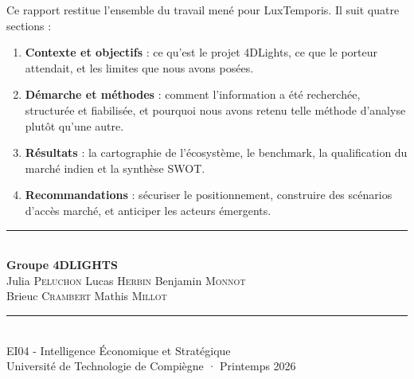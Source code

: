 \documentclass[11pt,a4paper]{article}
\begin{document}
\begin{center}
\begin{minipage}{0.85\linewidth}
{\small Ce rapport restitue l'ensemble du travail mené pour LuxTemporis. Il suit quatre sections :}
\begin{enumerate}[leftmargin=1.4em, itemsep=4pt]
  \item {\small \textbf{Contexte et objectifs} : ce qu'est le projet 4DLights, ce que le porteur attendait, et les limites que nous avons posées.}
  \item {\small \textbf{Démarche et méthodes} : comment l'information a été recherchée, structurée et fiabilisée, et pourquoi nous avons retenu telle méthode d'analyse plutôt qu'une autre.}
  \item {\small \textbf{Résultats} : la cartographie de l'écosystème, le benchmark, la qualification du marché indien et la synthèse SWOT.}
  \item {\small \textbf{Recommandations} : sécuriser le positionnement, construire des scénarios d'accès marché, et anticiper les acteurs émergents.}
\end{enumerate}
\end{minipage}
\end{center}

\vfill

\begin{center}
  \rule{0.5\linewidth}{0.4pt}\\[1.0em]
  {\normalsize\bfseries Groupe 4DLIGHTS}\\[0.6em]
  {\normalsize
    Julia \textsc{Peluchon} \quad\textbullet\quad
    Lucas \textsc{Herbin} \quad\textbullet\quad
    Benjamin \textsc{Monnot}\\[0.3em]
    Brieuc \textsc{Crambert} \quad\textbullet\quad
    Mathis \textsc{Millot}
  }\\[1.0em]
  \rule{0.5\linewidth}{0.4pt}\\[0.6em]
  {\small EI04 - Intelligence Économique et Stratégique}\\[0.2em]
  {\small Université de Technologie de Compiègne · Printemps 2026}
\end{center}

\newpage

\tableofcontents
\newpage
\end{document}
